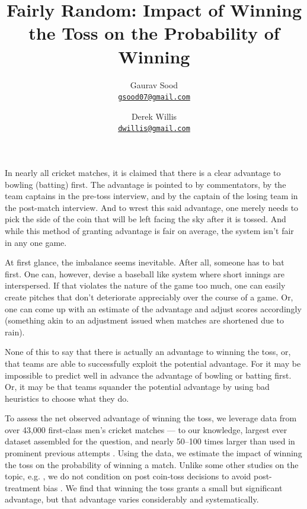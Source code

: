 \documentclass[11pt]{article}
\begin{document}
\title{\vspace{-1cm}\normalsize{\textbf{Fairly Random: Impact of Winning the Toss on the Probability of Winning}}}
\author{Gaurav Sood\\\small{\href{mailto:gsood07@gmail.com}{\tt{gsood07@gmail.com}}} \and Derek Willis\\\small{\href{mailto:dwillis@gmail.com}{\tt{dwillis@gmail.com}}}}
\maketitle
\doublespacing

In nearly all cricket matches, it is claimed that there is a clear advantage to bowling (batting) first. The advantage is pointed to by commentators, by the team captains in the pre-toss interview, and by the captain of the losing team in the post-match interview. And to wrest this said advantage, one merely needs to pick the side of the coin that will be left facing the sky after it is tossed. And while this method of granting advantage is fair on average, the system isn't fair in any one game. 

At first glance, the imbalance seems inevitable. After all, someone has to bat first. One can, however, devise a baseball like system where short innings are interspersed. If that violates the nature of the game too much, one can easily create pitches that don't deteriorate appreciably over the course of a game. Or, one can come up with an estimate of the advantage and adjust scores accordingly (something akin to an adjustment issued when matches are shortened due to rain).

None of this to say that there is actually an advantage to winning the toss, or, that teams are able to successfully exploit the potential advantage. For it may be impossible to predict well in advance the advantage of bowling or batting first. Or, it may be that teams squander the potential advantage by using bad heuristics to choose what they do.

To assess the net observed advantage of winning the toss, we leverage data from over 43,000 first-class men's cricket matches --- to our knowledge, largest ever dataset assembled for the question, and nearly 50--100 times larger than used in prominent previous attempts \citep[see,][]{dawson2009bat, de1998winning}. Using the data, we estimate the impact of winning the toss on the probability of winning a match. Unlike some other studies on the topic, e.g. \citet{dawson2009bat, Saad2015}, we do not condition on post coin-toss decisions to avoid post-treatment bias \citep[see][]{acharya2015}. We find that winning the toss grants a small but significant advantage, but that advantage varies considerably and systematically. 
\end{document}
